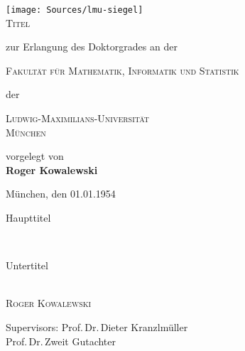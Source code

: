 
\begin{titlepage}
	\begin{center}
        \texttt{[image: Sources/lmu-siegel]}\\
        \vskip 1cm
		\textsc{\huge Titel}
                \vskip 1cm
                \begin{large}
                  zur Erlangung des Doktorgrades an der\\[0.50cm]
                  \begin{Large}
                    \textsc{Fakultät für Mathematik, Informatik und Statistik}\\[0.50cm]
                  \end{Large}
                  der\\[0.50cm]
                  \begin{Large}
                    \textsc{Ludwig-Maximilians-Universität\\München}\par
                  \end{Large}
                \end{large}
		\vfill
                {\large vorgelegt von}\\[0.5cm]
                {\LARGE \bfseries Roger Kowalewski}
    \vskip 1cm
    \begin{small}
        München, den 01.01.1954
    \end{small}
	\end{center}
\end{titlepage}


\begin{titlepage}
  \phantom{}
  \vfill
  \begin{center}
    \begin{singlespace*}
    \begin{Huge}
     Haupttitel
    \end{Huge}\\[0.2cm]
    \begin{Large}
      Untertitel
    \end{Large}\\[1em]
      \vskip 0.25cm
      \textsc{Roger Kowalewski}\par
    \end{singlespace*}
  \end{center}
  \vfill
  \begin{singlespace*}
    Supervisors:            Prof.\,Dr.\,Dieter Kranzlmüller\\
    \phantom{Supervisors:}  Prof.\,Dr.\,Zweit Gutachter
  \end{singlespace*}
\end{titlepage}

\newpage
\null
\thispagestyle{empty}
\newpage
